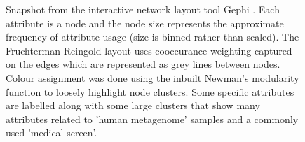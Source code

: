 \documentclass{bmcart}
\begin{document}
\begin{backmatter}
  \begin{figure}[h!]
  \caption{ 
  Snapshot from the interactive network layout tool Gephi \cite{bastian2009gephi}. Each attribute is a node and the node size represents the approximate frequency of attribute usage (size is binned rather than scaled). The Fruchterman-Reingold layout \cite{fruchterman1991graph} uses cooccurance weighting captured on the edges which are represented as grey lines between nodes. Colour assignment was done using the inbuilt Newman's modularity function \cite{newman2006modularity} to loosely highlight node clusters. Some specific attributes  are labelled along with some large clusters that show many attributes related to 'human metagenome' samples and a commonly used 'medical screen'.
  }
\label{fig:gephi}
\end{figure}




\end{backmatter}
\end{document}
